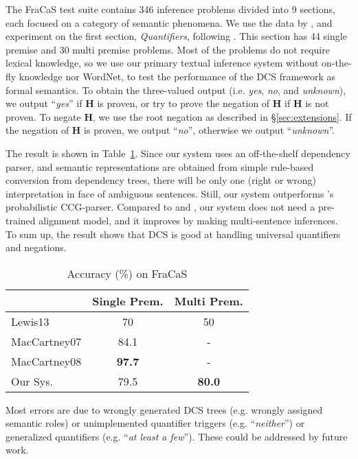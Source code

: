 \documentclass[11pt]{article}
\begin{document}
The FraCaS test suite contains 346 inference problems divided into 9 sections, each focused on a category of semantic phenomena. We use the data by , and experiment on the first section, \textit{Quantifiers}, following . 
This section has 44 single premise and 30 multi premise problems. 
Most of the problems do not require lexical knowledge, so we use our primary textual 
inference system without on-the-fly knowledge nor WordNet, to test the performance 
of the DCS framework as formal semantics. To obtain the three-valued output (i.e. \emph{yes}, 
\emph{no}, and \emph{unknown}), we output ``\emph{yes}'' if {\bf H} is proven, or try to 
prove the negation of {\bf H} if {\bf H} is not proven. To negate {\bf H}, we use the root 
negation as described in \S\ref{sec:extensions}. If the negation of {\bf H} is proven, we 
output ``\emph{no}'', otherwise we output ``\emph{unknown}''. 

The result is shown in Table~\ref{tab:fracasres}. Since 
our system uses an off-the-shelf dependency parser, and semantic representations are obtained 
from simple rule-based conversion from dependency trees, there will be only one (right or wrong) interpretation in face of ambiguous sentences. 
Still, our system outperforms 's probabilistic CCG-parser. 
Compared to  and , 
our system does not need a pre-trained alignment model, 
and it improves by making multi-sentence inferences. 
To sum up, the result shows that DCS is good at handling universal quantifiers and negations. 

\begin{table}[t]
\footnotesize
\centering
\setlength{\tabcolsep}{4pt}
\begin{tabular}{|l | c c |}
\hline
 & Single Prem. & Multi Prem. \\
\hline
Lewis13 & 70 & 50 \\
MacCartney07 & 84.1 & - \\
MacCartney08 & \textbf{97.7} & - \\
Our Sys. & 79.5 & \textbf{80.0} \\
\hline
\end{tabular}
\caption{Accuracy (\%) on FraCaS}
\label{tab:fracasres}
\end{table}

Most errors are due to wrongly generated DCS trees (e.g. wrongly assigned semantic roles) or 
unimplemented quantifier triggers (e.g. ``\textit{neither}'') or generalized quantifiers 
(e.g. ``\textit{at least a few}''). These could be addressed by future work. 
\end{document}
